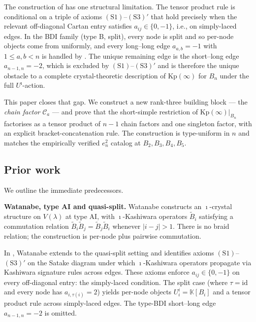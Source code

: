 \documentclass[11pt]{article}
\theoremstyle{definition}
\theoremstyle{remark}
\newcommand{\Kp}{\mathrm{Kp}}
\newcommand{\KK}{\mathbb{K}}
\newcommand{\Uiota}{U^\imath}
\newcommand{\Cmid}{\mathcal{C}}
\begin{document}
The construction of \cite{Watanabe2110} has one structural limitation. The tensor product rule
is conditional on a triple of axioms $(\mathrm{S1})$--$(\mathrm{S3})'$ that hold precisely when
the relevant off-diagonal Cartan entry satisfies $a_{ij} \in \{0, -1\}$, i.e., on simply-laced
edges. In the BDI family (type B, split), every node is split and so per-node objects come
from \cite[\S4.1]{Watanabe2110} uniformly, and every long--long edge $a_{a,b} = -1$ with
$1 \leq a, b < n$ is handled by \cite[Prop.~5.1.1]{Watanabe2110}. The unique remaining edge
is the short--long edge $a_{n-1,n} = -2$, which is excluded by $(\mathrm{S1})$--$(\mathrm{S3})'$
and is therefore the unique obstacle to a complete crystal-theoretic description of $\Kp(\infty)$
for $B_n$ under the full $\Uiota$-action.

This paper closes that gap. We construct a new rank-three building block --- the \emph{chain
factor} $\Cmid_a$ --- and prove that the short-simple restriction of $\Kp(\infty)|_{B_n}$
factorises as a tensor product of $n - 1$ chain factors and one singleton factor, with an
explicit bracket-concatenation rule. The construction is type-uniform in $n$ and matches the
empirically verified $e_n^2$ catalog at $B_2, B_3, B_4, B_5$.

\subsection{Prior work}

We outline the immediate predecessors.

\medskip
\noindent\textbf{Watanabe, type AI and quasi-split.}
Watanabe \cite{Watanabe2107} constructs an $\imath$-crystal structure on $V(\lambda)$ at type AI,
with $\imath$-Kashiwara operators $\widetilde B_i$ satisfying a commutation relation $\widetilde
B_i \widetilde B_j = \widetilde B_j \widetilde B_i$ whenever $|i - j| > 1$. There is no braid
relation; the construction is per-node plus pairwise commutation.

In \cite{Watanabe2110}, Watanabe extends to the quasi-split setting and identifies axioms
$(\mathrm{S1})$--$(\mathrm{S3})'$ on the Satake diagram under which $\imath$-Kashiwara
operators propagate via Kashiwara signature rules across edges. These axioms enforce $a_{ij}
\in \{0, -1\}$ on every off-diagonal entry: the simply-laced condition. The split case (where
$\tau = \mathrm{id}$ and every node has $a_{i,\tau(i)} = 2$) yields per-node objects $U^i_i =
\KK[B_i]$ and a tensor product rule across simply-laced edges. The type-BDI short--long edge
$a_{n-1,n} = -2$ is omitted.
\end{document}
